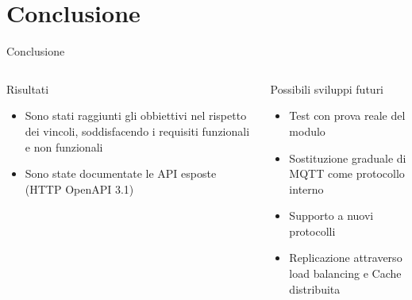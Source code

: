 \documentclass[aspectratio=169]{beamer}
\begin{document}
\section{Conclusione}
%
\begin{frame}{Conclusione}
    \begin{columns}
        \begin{block}{Risultati}
            \begin{itemize}
                \item Sono stati raggiunti gli obbiettivi nel rispetto dei vincoli, soddisfacendo i requisiti funzionali e non funzionali
                \item Sono state documentate le API esposte (HTTP OpenAPI 3.1)
            \end{itemize}
            \vspace{1.8em}
        \end{block}

        \begin{block}{Possibili sviluppi futuri}
            \begin{itemize}
                \item Test con prova reale del modulo
                \item Sostituzione graduale di MQTT come protocollo interno
                \item Supporto a nuovi protocolli
                \item Replicazione attraverso load balancing e Cache distribuita
            \end{itemize}
        \end{block}
    \end{columns}
\end{frame}
%
\end{document}

